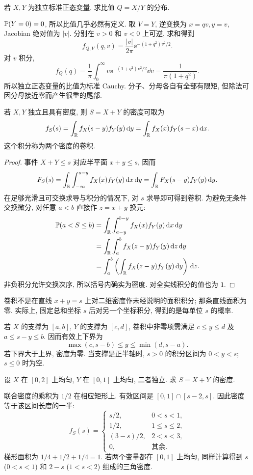 \begin{example}
若 $X,Y$ 为独立标准正态变量, 求比值 $Q=X/Y$ 的分布.
\end{example}
\begin{solution}
$\mathbb P(Y=0)=0$, 所以比值几乎必然有定义. 取 $V=Y$, 逆变换为 $x=qv,y=v$, Jacobian 绝对值为 $|v|$. 分别在 $v>0$ 和 $v<0$ 上可逆, 求和得到
\[
 f_{Q,V}(q,v)=\frac{|v|}{2\pi}\ee^{-(1+q^2)v^2/2}.
\]
对 $v$ 积分,
\[
 f_Q(q)=\frac1\pi\int_0^\infty v\ee^{-(1+q^2)v^2/2}\dd v
       =\frac1{\pi(1+q^2)}.
\]
所以独立正态变量的比值为标准 Cauchy. 分子、分母各自有全部有限矩, 但除法可因分母接近零而产生很重的尾部.
\end{solution}


\begin{theorem}[连续卷积]
若 $X,Y$ 独立且具有密度, 则 $S=X+Y$ 的密度可取为
\[
 f_S(s)=\int_{\mathbb R} f_X(s-y)f_Y(y)\,\mathrm d y
       =\int_{\mathbb R} f_X(x)f_Y(s-x)\,\mathrm d x.
\]
这个积分称为两个密度的卷积.
\end{theorem}
\begin{proof}
事件 $X+Y\le s$ 对应半平面 $x+y\le s$, 因而
\[
 F_S(s)=\int_{\mathbb R}\int_{-\infty}^{s-y}f_X(x)f_Y(y)\,\mathrm d x\,\mathrm d y
       =\int_{\mathbb R}F_X(s-y)f_Y(y)\,\mathrm d y.
\]
在足够光滑且可交换求导与积分的情况下, 对 $s$ 求导即可得到卷积. 为避免无条件交换微分, 对任意 $a<b$ 直接作 $z=x+y$ 换元:
\begin{align*}
 \mathbb P(a<S\le b)
 &=\int_{\mathbb R}\int_{a-y}^{b-y}f_X(x)f_Y(y)\,\mathrm d x\,\mathrm d y\\
 &=\int_{\mathbb R}\int_a^b f_X(z-y)f_Y(y)\,\mathrm d z\,\mathrm d y\\
 &=\int_a^b\left(\int_{\mathbb R}f_X(z-y)f_Y(y)\,\mathrm d y\right)\,\mathrm d z.
\end{align*}
非负积分允许交换次序, 所以括号内确实为密度. 对全实线积分的值也为 $1$.
\end{proof}

卷积不是在直线 $x+y=s$ 上对二维密度作未经说明的面积积分; 那条直线面积为零. 实际上, 固定总和坐标 $s$ 后对另一个坐标积分, 得到的是每单位 $s$ 的概率.

若 $X$ 的支撑为 $[a,b]$, $Y$ 的支撑为 $[c,d]$, 卷积中非零项需满足 $c\le y\le d$ 及 $a\le s-y\le b$. 因而有效上下界为
\[
 \max(c,s-b)\le y\le\min(d,s-a).
\]
若下界大于上界, 密度为零. 当支撑是正半轴时, $s>0$ 的积分区间为 $0<y<s$; $s\le0$ 时为空.

\begin{example}
设 $X$ 在 $[0,2]$ 上均匀, $Y$ 在 $[0,1]$ 上均匀, 二者独立. 求 $S=X+Y$ 的密度.
\end{example}
\begin{solution}
联合密度的乘积为 $1/2$ 在相应矩形上. 有效区间是
$[0,1]\cap[s-2,s]$. 因此密度等于该区间长度的一半:
\[
 f_S(s)=\begin{cases}
  s/2,&0<s<1,\\
  1/2,&1\le s\le2,\\
  (3-s)/2,&2<s<3,\\
  0,&\text{其余}.
 \end{cases}
\]
梯形面积为 $1/4+1/2+1/4=1$. 若两个变量都在 $[0,1]$ 上均匀, 同样计算得到 $s$ ($0<s<1$) 和 $2-s$ ($1<s<2$) 组成的三角密度.
\end{solution}

